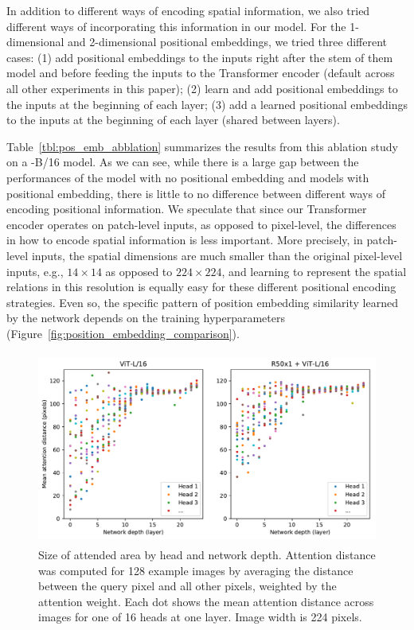 In addition to different ways of encoding spatial information, we also tried different ways of incorporating this information in our model. For the 1-dimensional and 2-dimensional positional embeddings, we tried three different cases: (1) add positional embeddings to the inputs right after the stem of them model and before feeding the inputs to the Transformer encoder (default across all other experiments in this paper); (2) learn and add positional embeddings to the inputs at the beginning of each layer; (3) add a learned positional embeddings to the inputs at the beginning of each layer (shared between layers).

Table~\ref{tbl:pos_emb_abblation} summarizes the results from this ablation study on a \oursabbrv-B/16 model. As we can see, while there is a large gap between the performances of the model with no positional embedding and models with positional embedding, there is little to no difference between different ways of encoding positional information. We speculate that since our Transformer encoder operates on patch-level inputs, as opposed to pixel-level, the differences in how to encode spatial information is less important. More precisely, in patch-level inputs, the spatial dimensions are much smaller than the original pixel-level inputs, e.g., $14\times14$ as opposed to $224\times224$, and learning to represent the spatial relations in this resolution is equally easy for these different positional encoding strategies.
Even so, the specific pattern of position embedding similarity learned by the network depends on the training hyperparameters (Figure~\ref{fig:position_embedding_comparison}).

\begin{figure}[h]
\begin{center}
\includegraphics[height=2.5in]{images/visualizations/20201001_attention_distance_by_depth.pdf}
\end{center}
\caption{Size of attended area by head and network depth. Attention distance was computed for 128 example images by averaging the distance between the query pixel and all other pixels, weighted by the attention weight. Each dot shows the mean attention distance across images for one of 16 heads at one layer. Image width is 224 pixels.}
\label{fig:attention_distance}
\end{figure}

